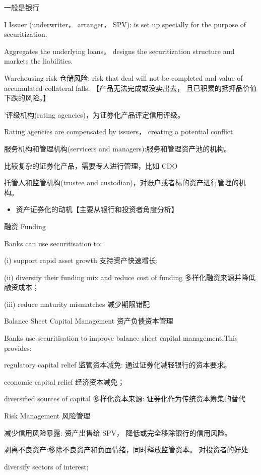 一般是银行

I Issuer (underwriter， arranger， SPV): is set up specially for the purpose of securitization.

Aggregates the underlying loans， designs the securitization structure and markets the liabilities.

Warehousing risk 仓储风险: risk that deal will not be completed and value of accumulated collateral falls. 【产品无法完成或没卖出去， 且已积累的抵押品价值下跌的风险。】

’评级机构(rating agencies)，为证券化产品评定信用评级。

Rating agencies are compensated by issuers， creating a potential conflict

 服务机构和管理机构(servicers and managers):服务和管理资产池的机构。

比较复杂的证券化产品，需要专人进行管理，比如 CDO

 托管人和监管机构(trustee and custodian)，对账户或者标的资产进行管理的机构。

\begin{itemize}
\item 资产证券化的动机【主要从银行和投资者角度分析】
\end{itemize}

融资 Funding

Banks can use securitisation to:

(i) support rapid asset growth 支持资产快速增长;

(ii) diversify their funding mix and reduce cost of funding 多样化融资来源并降低融资成本；

(iii) reduce maturity mismatches 减少期限错配

Balance Sheet Capital Management 资产负债资本管理

Banks use securitisation to improve balance sheet capital management.This provides:

regulatory capital relief 监管资本减免: 通过证券化减轻银行的资本要求。

economic capital relief 经济资本减免；

diversified sources of capital 多样化资本来源: 证券化作为传统资本筹集的替代

Risk Management 风险管理

减少信用风险暴露: 资产出售给 SPV， 降低或完全移除银行的信用风险。

剥离不良资产:移除不良资产和负面情绪，同时释放监管资本。 对投资者的好处

diversify sectors of interest;


